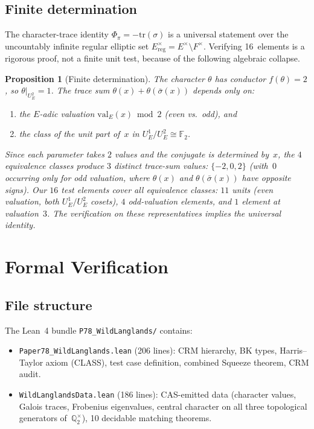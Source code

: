 \documentclass[11pt]{article}
\theoremstyle{plain}
\newtheorem{proposition}[theorem]{Proposition}
\theoremstyle{definition}
\theoremstyle{remark}
\newcommand{\Q}{\mathbb{Q}}
\newcommand{\F}{\mathbb{F}}
\newcommand{\tr}{\mathrm{tr}}
\newcommand{\val}{\mathrm{val}}
\newcommand{\Phipi}{\Phi_\pi}
\begin{document}
\subsection{Finite determination}\label{ssec:findet}

The character-trace identity $\Phipi = -\tr(\sigma)$ is a
universal statement over the uncountably infinite regular
elliptic set $E^\times_{\mathrm{reg}} = E^\times \setminus
F^\times$.  Verifying 16~elements is a rigorous proof, not a
finite unit test, because of the following algebraic collapse.

\begin{proposition}[Finite determination]\label{prop:findet}
The character $\theta$ has conductor $f(\theta) = 2$, so
$\theta|_{U_E^2} = 1$.  The trace sum
$\theta(x) + \theta(\bar\sigma(x))$ depends only on:
\begin{enumerate}[nosep,label=(\roman*)]
\item the $E$-adic valuation $\val_E(x) \bmod 2$
  (even vs.\ odd), and
\item the class of the unit part of~$x$ in
  $U_E^1/U_E^2 \cong \F_2$.
\end{enumerate}
Since each parameter takes $2$ values and the conjugate
is determined by~$x$, the $4$ equivalence classes produce
$3$ distinct trace-sum values: $\{-2, 0, 2\}$ (with~$0$
occurring only for odd valuation, where $\theta(x)$ and
$\theta(\bar\sigma(x))$ have opposite signs).  Our $16$ test elements cover
all equivalence classes: $11$ units (even valuation, both
$U_E^1/U_E^2$ cosets), $4$ odd-valuation elements, and
$1$ element at valuation~$3$.  The verification on these
representatives implies the universal identity.
\end{proposition}

\section{Formal Verification}\label{sec:lean}

\subsection{File structure}

The Lean~4 bundle \texttt{P78\_WildLanglands/} contains:
\begin{itemize}[nosep]
\item \texttt{Paper78\_WildLanglands.lean} (206 lines):
  CRM hierarchy, BK types, Harris--Taylor axiom (CLASS),
  test case definition, combined Squeeze theorem, CRM audit.
\item \texttt{WildLanglandsData.lean} (186 lines):
  CAS-emitted data (character values, Galois traces,
  Frobenius eigenvalues, central character on all three
  topological generators of~$\Q_2^\times$), 10 decidable
  matching theorems.
\end{itemize}
\end{document}
